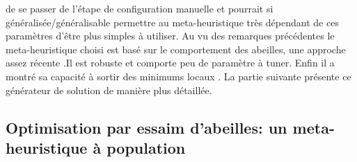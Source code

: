 de se passer de l’étape de configuration manuelle et pourrait si généralisée/généralisable
permettre au meta-heuristique très dépendant de ces paramètres d’être plus simples
à utiliser.
Au vu des remarques précédentes le meta-heuristique choisi est basé sur le
comportement des abeilles, une approche assez récente .Il est
robuste  et comporte peu de paramètre à tuner. Enfin il
a montré sa capacité à sortir des minimums locaux .
La partie suivante présente ce générateur de solution de manière plus détaillée.


\subsection{Optimisation par essaim d’abeilles: un meta-heuristique à population} %
\label{sub:optimisation_par_essaim_d_abeilles_un_meta_heuristique_a_population}

